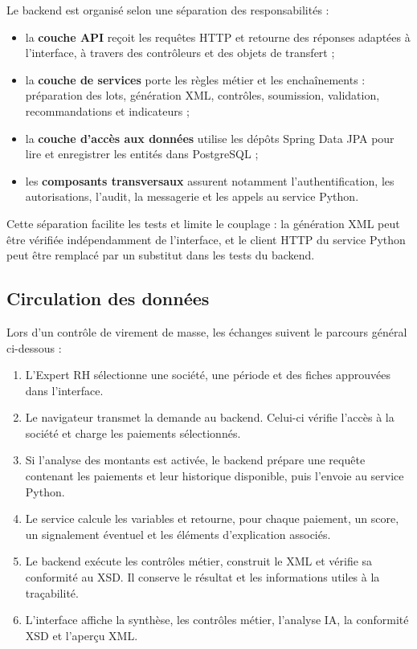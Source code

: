 Le backend est organisé selon une séparation des responsabilités :
\begin{itemize}
    \item la \textbf{couche API} reçoit les requêtes HTTP et retourne des réponses adaptées à l'interface, à travers des contrôleurs et des objets de transfert ;
    \item la \textbf{couche de services} porte les règles métier et les enchaînements : préparation des lots, génération XML, contrôles, soumission, validation, recommandations et indicateurs ;
    \item la \textbf{couche d'accès aux données} utilise les dépôts Spring Data JPA pour lire et enregistrer les entités dans PostgreSQL ;
    \item les \textbf{composants transversaux} assurent notamment l'authentification, les autorisations, l'audit, la messagerie et les appels au service Python.
\end{itemize}

Cette séparation facilite les tests et limite le couplage : la génération XML peut être vérifiée indépendamment de l'interface, et le client HTTP du service Python peut être remplacé par un substitut dans les tests du backend.

\subsection{Circulation des données}

Lors d'un contrôle de virement de masse, les échanges suivent le parcours général ci-dessous :
\begin{enumerate}
    \item L'Expert RH sélectionne une société, une période et des fiches approuvées dans l'interface.
    \item Le navigateur transmet la demande au backend. Celui-ci vérifie l'accès à la société et charge les paiements sélectionnés.
    \item Si l'analyse des montants est activée, le backend prépare une requête contenant les paiements et leur historique disponible, puis l'envoie au service Python.
    \item Le service calcule les variables et retourne, pour chaque paiement, un score, un signalement éventuel et les éléments d'explication associés.
    \item Le backend exécute les contrôles métier, construit le XML et vérifie sa conformité au XSD. Il conserve le résultat et les informations utiles à la traçabilité.
    \item L'interface affiche la synthèse, les contrôles métier, l'analyse IA, la conformité XSD et l'aperçu XML.
\end{enumerate}

